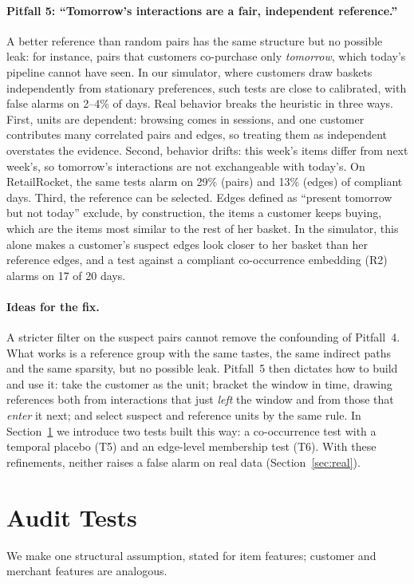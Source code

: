 \documentclass[10pt,twocolumn,letterpaper]{article}
\theoremstyle{definition}
\begin{document}
\paragraph{Pitfall 5: ``Tomorrow's interactions are a fair, independent reference.''}
A better reference than random pairs has the same structure but no possible
leak: for instance, pairs that customers co-purchase only \emph{tomorrow},
which today's pipeline cannot have seen. In our simulator, where customers
draw baskets independently from stationary preferences, such tests are close
to calibrated, with false alarms on 2--4\% of days. Real behavior breaks the
heuristic in three ways. First, units are dependent: browsing comes in
sessions, and one customer contributes many correlated pairs and edges, so
treating them as independent overstates the evidence. Second, behavior
drifts: this week's items differ from next week's, so tomorrow's interactions
are not exchangeable with today's. On RetailRocket, the same tests alarm on
29\% (pairs) and 13\% (edges) of compliant days. Third, the reference can be
selected. Edges defined as ``present tomorrow but not today'' exclude, by
construction, the items a customer keeps buying, which are the items most
similar to the rest of her basket. In the simulator, this alone makes a
customer's suspect edges look closer to her basket than her reference edges,
and a test against a compliant co-occurrence embedding (R2) alarms on 17 of
20 days.

\paragraph{Ideas for the fix.}
A stricter filter on the suspect pairs cannot remove the confounding of
Pitfall~4. What works is a reference group with the same tastes, the same
indirect paths and the same sparsity, but no possible leak. Pitfall~5 then
dictates how to build and use it: take the customer as the unit; bracket the
window in time, drawing references both from interactions that just
\emph{left} the window and from those that \emph{enter} it next; and select
suspect and reference units by the same rule. In Section~\ref{sec:tests} we
introduce two tests built this way: a co-occurrence test with a temporal
placebo (T5) and an edge-level membership test (T6). With these refinements,
neither raises a false alarm on real data (Section~\ref{sec:real}).

\section{Audit Tests}\label{sec:tests}
We make one structural assumption, stated for item features; customer and
merchant features are analogous.
\end{document}
